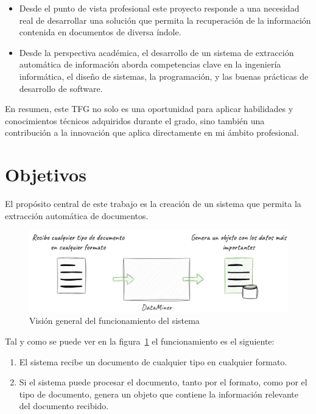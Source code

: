 \begin{itemize}
    \item Desde el punto de vista profesional este proyecto responde a una necesidad real de desarrollar una solución
    que permita la recuperación de la información contenida en documentos de diversa índole.
    \item Desde la perspectiva académica, el desarrollo de un sistema de extracción automática de información aborda
    competencias clave en la ingeniería informática, el diseño de sistemas, la programación, y las buenas prácticas de
    desarrollo de software.
\end{itemize}

En resumen, este TFG no solo es una oportunidad para aplicar habilidades y conocimientos técnicos adquiridos durante el
grado, sino también una contribución a la innovación que aplica directamente en mi ámbito profesional.


\section{Objetivos}

El propósito central de este trabajo es la creación de un sistema que permita la extracción automática de documentos.

\begin{figure}[ht]
    \begin{center}
        \includegraphics[width=\textwidth]{./chapter/1/images/chapter_1.overview}
        \caption{Visión general del funcionamiento del sistema}
        \label{fig:chapter_1.overview}
    \end{center}
\end{figure}

Tal y como se puede ver en la figura~\ref{fig:chapter_1.overview} el funcionamiento es el siguiente:

\begin{enumerate}
    \item El sistema recibe un documento de cualquier tipo en cualquier formato.
    \item
    Si el sistema puede procesar el documento, tanto por el formato, como por el tipo de documento, genera un objeto que
    contiene la información relevante del documento recibido.
\end{enumerate}

